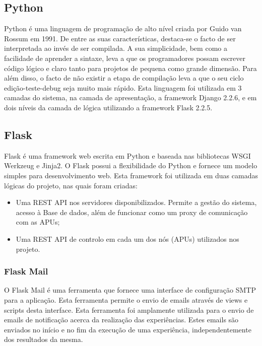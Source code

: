 \subsection{Python}
Python é uma linguagem de programação de alto nível criada por Guido van Rossum em 1991. De entre as suas características, destaca-se o facto de ser interpretada ao invés de ser compilada.\cite{python}\newline
A sua simplicidade, bem como a facilidade de aprender a sintaxe, leva a que os programadores possam escrever código lógico e claro tanto para projetos de pequena como grande dimensão. Para além disso, o facto de não existir a etapa de compilação leva a que o seu ciclo edição-teste-debug seja muito mais rápido.\newline
Esta linguagem foi utilizada em 3 camadas do sistema, na camada de apresentação, a framework Django 2.2.6, e em dois níveis da camada de lógica utilizando a framework Flask 2.2.5. 

\subsection{Flask}
Flask é uma framework web escrita em Python e baseada nas bibliotecas WSGI Werkzeug e  Jinja2. O Flask possui a flexibilidade do Python e fornece um modelo simples para desenvolvimento web.\cite{flask}\newline
Esta framework foi utilizada em duas camadas lógicas do projeto, nas quais foram criadas:
\begin{itemize}
    \item Uma REST API nos servidores disponibilizados. Permite a gestão do sistema, acesso à Base de dados, além de funcionar como um proxy de comunicação com as APUs;
    \item Uma REST API de controlo em cada um dos nós (APUs) utilizados nos projeto.
\end{itemize}

\subsubsection{Flask Mail}
O Flask Mail é uma ferramenta que fornece uma interface de configuração SMTP para a aplicação. Esta ferramenta permite o envio de emails através de views e scripts desta interface.\cite{flaskmail}\newline
Esta ferramenta foi amplamente utilizada para o envio de emails de notificação acerca da realização das experiências. Estes emails são enviados no início e no fim da execução de uma experiência, independentemente dos resultados da mesma. 

